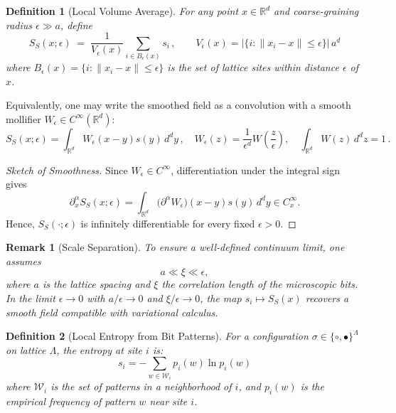 \documentclass[12pt, a4paper]{article}
\newtheorem{definition}{Definition}[section]
\newtheorem*{remark}{Remark}
\begin{document}
\begin{definition}[Local Volume Average]
For any point $x \in \mathbb{R}^d$ and coarse-graining radius $\epsilon \gg a$, define
\[
S_S(x; \epsilon) \;=\; \frac{1}{V_\epsilon(x)} \sum_{i \in B_\epsilon(x)} s_i \,,
\qquad
V_\epsilon(x) = \bigl|\{ i : \|x_i - x\| \leq \epsilon \} \bigr|\, a^d
\]
where $B_\epsilon(x) = \{ i : \|x_i - x\| \leq \epsilon \}$ is the set of lattice sites within distance $\epsilon$ of $x$.
\end{definition}

\begin{lemma}
Equivalently, one may write the smoothed field as a convolution with a smooth mollifier $W_\epsilon \in C^\infty(\mathbb{R}^d)$:
\[
S_S(x; \epsilon) = \int_{\mathbb{R}^d} W_\epsilon(x - y) s(y) \, d^d y\,,
\quad
W_\epsilon(z) = \frac{1}{\epsilon^d} W\!\left(\frac{z}{\epsilon}\right),
\quad
\int_{\mathbb{R}^d} W(z) \, d^d z = 1\,.
\]
\end{lemma}

\begin{proof}[Sketch of Smoothness]
Since $W_\epsilon \in C^\infty$, differentiation under the integral sign gives
\[
\partial_x^\alpha S_S(x; \epsilon) = \int_{\mathbb{R}^d} \bigl(\partial^\alpha W_\epsilon\bigr)(x - y) s(y) \, d^d y \in C^\infty_x.
\]
Hence, $S_S(\cdot; \epsilon)$ is infinitely differentiable for every fixed $\epsilon > 0$.
\end{proof}

\begin{remark}[Scale Separation]
To ensure a well-defined continuum limit, one assumes
\[
a \ll \xi \ll \epsilon,
\]
where $a$ is the lattice spacing and $\xi$ the correlation length of the microscopic bits. In the limit $\epsilon \to 0$ with $a/\epsilon \to 0$ and $\xi/\epsilon \to 0$, the map $s_i \mapsto S_S(x)$ recovers a smooth field compatible with variational calculus.
\end{remark}


\begin{definition}[Local Entropy from Bit Patterns]
For a configuration $\sigma \in \{\circ, \bullet\}^\Lambda$ on lattice $\Lambda$, the entropy at site $i$ is:
\[
s_i = - \sum_{w \in \mathcal{W}_i} p_i(w) \ln p_i(w)
\]
where $\mathcal{W}_i$ is the set of patterns in a neighborhood of $i$, and $p_i(w)$ is the empirical frequency of pattern $w$ near site $i$.
\end{definition}
\end{document}
